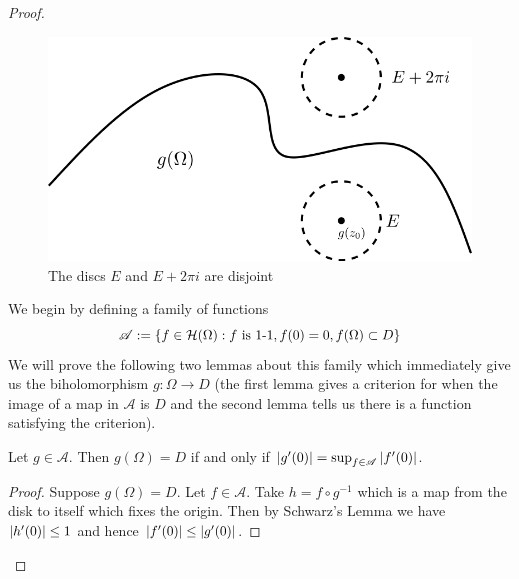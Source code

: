 \begin{proof}
    \begin{figure}[ht]
        \centering
        \includegraphics[scale=0.85]{Images/riem_map_pf_2.png}
        \caption{The discs $E$ and $E + 2\pi i$ are disjoint}
        \label{fig:riem-map-pf-2}
    \end{figure}

    We begin by defining a family of functions
    $$\mathscr{A} := \{f \in \mathcal{H}(\Omega) : f \text{ is 1-1}, f(0) = 0, f(\Omega) \subset D\}$$
    We will prove the following two lemmas about this family which immediately give us the biholomorphism $g: \Omega \to D$ (the first lemma gives a criterion for when the image of a map in $\mathscr{A}$ is $D$ and the second lemma tells us there is a function satisfying the criterion). 
    \begin{lemma}
        Let $g \in \mathscr{A}$. Then $g(\Omega) = D$ if and only if $\left|g'(0)\right| = \sup_{f \in \mathscr{A}} \left|f'(0)\right|$.
    \end{lemma}
    \begin{proof}
        Suppose $g(\Omega) = D$. Let $f \in \mathscr{A}$. Take $h = f \circ g^{-1}$ which is a map from the disk to itself which fixes the origin. Then by Schwarz's Lemma we have $\left|h'(0)\right| \leq 1$ and hence $\left|f'(0)\right| \leq \left|g'(0)\right|$. 


\end{proof}
\end{proof}
